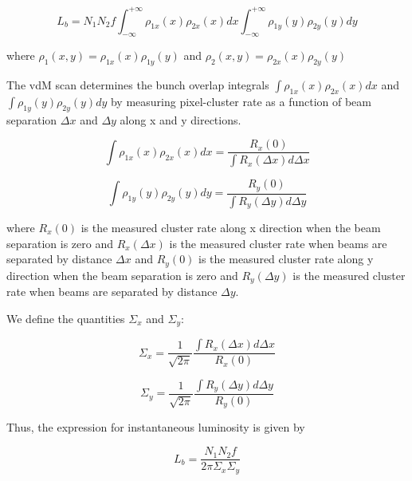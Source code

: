 \begin{equation}
L_{b} = N_1 N_2 f \int^{+\infty}_{-\infty} \rho_{1x}(x) \rho_{2x}(x)  dx   \int^{+\infty}_{-\infty} \rho_{1y}(y) \rho_{2y}(y)  dy 
\end{equation}

where $\rho_1(x,y) = \rho_{1x}(x) \rho_{1y} (y)$ and $\rho_2(x,y) = \rho_{2x}(x) \rho_{2y} (y)$ 

The vdM scan determines the bunch  overlap integrals $\int \rho_{1x} (x) \rho_{2x} (x) dx$ and  $\int \rho_{1y}(y) \rho_{2y} (y) dy$ by measuring pixel-cluster rate as a function of beam separation $\Delta x$ and $\Delta y$ along x and y directions. 

\begin{equation}
\int \rho_{1x} (x) \rho_{2x} (x) dx = \frac{R_x(0)}{\int R_x(\Delta x)d \Delta x} 
\end{equation}

\begin{equation}
\int \rho_{1y} (y) \rho_{2y} (y) dy = \frac{R_y(0)}{\int R_y(\Delta y)d \Delta y} 
\end{equation}

where $R_x(0)$ is the measured cluster rate along x direction when the beam separation is zero and $R_x(\Delta x)$ is the measured cluster rate when beams are separated by distance $\Delta x$ and $R_y(0)$ is the measured cluster rate along y direction when the beam separation is zero and $R_y(\Delta y)$ is the measured cluster rate when beams are separated by distance $\Delta y$. 

We define the quantities $\Sigma_x$ and $\Sigma_y$:


\begin{equation}
\Sigma_x = \frac{1}{\sqrt{2 \pi}} \frac{\int R_x(\Delta x)d \Delta x}{R_x(0)} 
\end{equation}

\begin{equation}
\Sigma_y =  \frac{1}{\sqrt{2 \pi}} \frac{\int R_y(\Delta y)d \Delta y}{R_y(0)} 
\end{equation}

Thus, the expression for instantaneous luminosity is given by 

\begin{equation}
L_{b} = \frac{N_1 N_2 f}{2\pi \Sigma_x \Sigma_y}
\end{equation}

